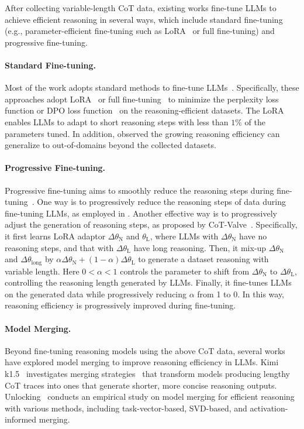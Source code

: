 After collecting variable-length CoT data, existing works fine-tune LLMs to achieve efficient reasoning in several ways, which include standard fine-tuning (e.g., parameter-efficient fine-tuning such as LoRA~\cite{hu2022lora} or full fine-tuning) and progressive fine-tuning.

\paragraph{\textbf{Standard Fine-tuning.}}
Most of the work adopts standard methods to fine-tune LLMs~\cite{liu2024can, munkhbat2025self, yu2024distilling, kang2024c3ot, xia2025tokenskip, han2024token}. 
Specifically, these approaches adopt LoRA~\cite{hu2022lora} or full fine-tuning~\cite{kang2024c3ot} to minimize the perplexity loss function or DPO loss function~\cite{han2024token} on the reasoning-efficient datasets.
The LoRA enables LLMs to adapt to short reasoning steps with less than $1\%$ of the parameters tuned.
In addition, \cite{liu2024can} observed the growing reasoning efficiency can generalize to out-of-domains beyond the collected datasets.

\paragraph{\textbf{Progressive Fine-tuning.}}
Progressive fine-tuning aims to smoothly reduce the reasoning steps during fine-tuning~\cite{ma2025cot, liu2024can}.
One way is to progressively reduce the reasoning steps of data during fine-tuning LLMs, as employed in \cite{liu2024can}.
Another effective way is to progressively adjust the generation of reasoning steps, as proposed by CoT-Valve~\cite{ma2025cot}. 
Specifically, it first learns LoRA adaptor $\Delta \theta_{\text{N}}$ and $\theta_{\text{L}}$, where LLMs with $\Delta \theta_{\text{N}}$ have no reasoning steps, and that with $\Delta \theta_{\text{L}}$ have long reasoning.
Then, it mix-up $\Delta \theta_{\text{N}}$ and $\Delta \theta_{\text{long}}$ by  
$\alpha \Delta \theta_{\text{N}} + (1-\alpha) \Delta \theta_{\text{L}}$ to generate a dataset reasoning with variable length.
Here $0 < \alpha < 1$ controls the parameter to shift from $\Delta \theta_{\text{N}}$ to $\Delta \theta_{\text{L}}$, controlling the reasoning length generated by LLMs.
Finally, it fine-tunes LLMs on the generated data while progressively reducing $\alpha$ from 1 to 0.
In this way, reasoning efficiency is progressively improved during fine-tuning.

\paragraph{Model Merging.} Beyond fine-tuning reasoning models using the above CoT data, several works have explored model merging to improve reasoning efficiency in LLMs. Kimi k1.5~\cite{team2025kimi} investigates merging strategies~\cite{yang2024modelmergingllmsmllms} that transform models producing lengthy CoT traces into ones that generate shorter, more concise reasoning outputs. Unlocking~\cite{wu2025unlockingefficientlongtoshortllm} conducts an empirical study on model merging for efficient reasoning with various methods, including task-vector-based, SVD-based, and activation-informed merging. 